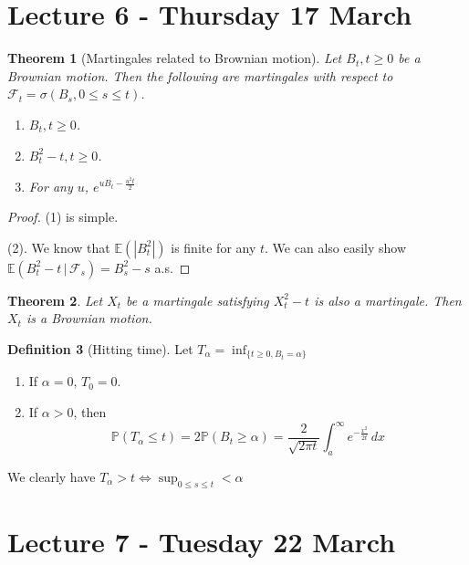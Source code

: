 \documentclass[10pt, oneside, reqno]{amsart}
\theoremstyle{plain}%
\newtheorem{thm}{Theorem}[section]
\theoremstyle{definition}
\newtheorem{defn}[thm]{Definition}
\theoremstyle{remark}
\renewcommand{\P}{\mathbb{P}}
\newcommand{\E}{\mathbb{E}}
\newcommand{\sigf}{\mathcal{F}}
\begin{document}
\section{Lecture 6 - Thursday 17 March} %
\label{sec:lecture_6_thursday_17_march}
\begin{thm}[Martingales related to Brownian motion]
	Let $B_t, t \geq 0$ be a Brownian motion.  Then the following are martingales with respect to $\sigf_t = \sigma( B_s, 0 \leq s \leq t)$.  
	\begin{enumerate}[(1)]
		\item $B_t, t \geq 0$.
		\item $B_t^2 - t, t \geq 0$.
		\item For any $u$, $e^{u B_t - \frac{u^2 t}{2}}$
	\end{enumerate}
\end{thm}
\begin{proof}
	(1) is simple.  
	
	(2).  We know that $\E( |B_t^2|)$ is finite for any $t$.  We can also easily show $\E(B_t^2 - t \, | \, \sigf_s ) = B_s^2 - s$ a.s.
\end{proof}

\begin{thm}
	Let $X_t$ be a martingale satisfying $X_t^2 - t$ is also a martingale.  Then $X_t$ is a Brownian motion.
\end{thm}

\begin{defn}[Hitting time]
	Let $T_\alpha = \inf_{\{ t \geq 0, B_t = \alpha \}}$ 
	
	\begin{enumerate}[(1)]
		\item If $\alpha = 0$, $T_0 = 0$.
		\item If $\alpha > 0$, then \[
			\P(T_\alpha \leq t) = 2 \P(B_t \geq \alpha) = \frac{2}{\sqrt{2 \pi t}} \int_a^\infty e^{-\frac{x^2}{2t}}\, dx 
		\] 	
	\end{enumerate}
	
	We clearly have $T_\alpha > t \iff \sup_{ 0 \leq s \leq t} < \alpha$ 
	
\end{defn}


\section{Lecture 7 - Tuesday 22 March} %
\label{sec:lecture_7_tuesday_22_march}
\end{document}
